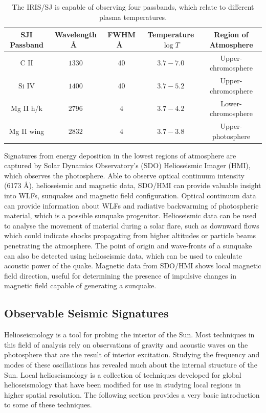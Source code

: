 \begin{table}[H]
\centering
\begin{tabular}{|c|c|c|c|c|}
SJI Passband & Wavelength \AA\ & FWHM \AA\ & Temperature $\log{T}$ & Region of Atmosphere\\ 
\hline
C II  & $1330$ & $40$ & $3.7 - 7.0$ & Upper-chromosphere\\ 
Si IV  & $1400$ & $40$ & $3.7 - 5.2$ & Upper-chromosphere\\ 
Mg II h/k & $2796$ & $4$ & $3.7 - 4.2$ & Lower-chromosphere\\ 
Mg II wing & $2832$ & $4$ & $3.7 - 3.8$ & Upper-photosphere\\   
\end{tabular}
\caption{The IRIS/SJ is capable of observing four passbands, which relate to different plasma temperatures.}\label{iris-sj}
\end{table}  

Signatures from energy deposition in the lowest regions of atmosphere are captured by Solar Dynamics Observatory's (SDO) Helioseismic Imager (HMI), which observes the photosphere. Able to observe optical continuum intensity (6173 \AA), helioseismic and magnetic data, SDO/HMI can provide valuable insight into WLFs, sunquakes and magnetic field configuration. Optical continuum data can provide information about WLFs and radiative backwarming of photospheric material, which is a possible sunquake progenitor. Helioseismic data can be used to analyse the movement of material during a solar flare, such as downward flows which could indicate shocks propagating from higher altitudes or particle beams penetrating the atmosphere. The point of origin and wave-fronts of a sunquake can also be detected using helioseismic data, which can be used to calculate acoustic power of the quake. Magnetic data from SDO/HMI shows local magnetic field direction, useful for determining the presence of impulsive changes in magnetic field capable of generating a sunquake.     



\subsection{Observable Seismic Signatures}
Helioseismology is a tool for probing the interior of the Sun. Most techniques in this field of analysis rely on observations of gravity and acoustic waves on the photosphere that are the result of interior excitation. Studying the frequency and modes of these oscillations has revealed much about the internal structure of the Sun. Local helioseismology is a collection of techniques developed for global helioseismology that have been modified for use in studying local regions in higher spatial resolution. The following section provides a very basic introduction to some of these techniques. 

